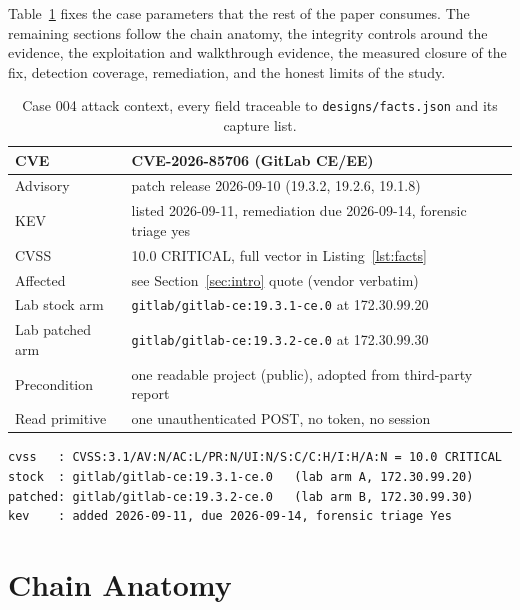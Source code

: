 \documentclass[journal]{IEEEtran}
\begin{document}
Table~\ref{tab:context} fixes the case parameters that the rest of the paper
consumes. The remaining sections follow the chain anatomy, the integrity
controls around the evidence, the exploitation and walkthrough evidence, the
measured closure of the fix, detection coverage, remediation, and the honest
limits of the study.

\begin{table}[t]
\caption{Case 004 attack context, every field traceable to
\texttt{designs/facts.json} and its capture list.}
\centering
\footnotesize
\begin{tabular}{p{1.62cm}p{5.15cm}}
\toprule
CVE & CVE-2026-85706 (GitLab CE/EE) \\
\midrule
Advisory & patch release 2026-09-10 (19.3.2, 19.2.6, 19.1.8) \\
KEV & listed 2026-09-11, remediation due 2026-09-14, forensic triage yes \\
CVSS & 10.0 CRITICAL, full vector in Listing~\ref{lst:facts} \\
Affected & see Section~\ref{sec:intro} quote (vendor verbatim) \\
Lab stock arm & \texttt{gitlab/gitlab-ce:19.3.1-ce.0} at 172.30.99.20 \\
Lab patched arm & \texttt{gitlab/gitlab-ce:19.3.2-ce.0} at 172.30.99.30 \\
Precondition & one readable project (public), adopted from third-party report \\
Read primitive & one unauthenticated POST, no token, no session \\
\bottomrule
\end{tabular}
\label{tab:context}
\end{table}

\begin{lstlisting}[style=facts, caption={Machine-readable case facts block
(the CVSS vector and build identifiers as published by their sources), captured
to \texttt{designs/facts.json}.}, label={lst:facts}]
cvss   : CVSS:3.1/AV:N/AC:L/PR:N/UI:N/S:C/C:H/I:H/A:N = 10.0 CRITICAL
stock  : gitlab/gitlab-ce:19.3.1-ce.0   (lab arm A, 172.30.99.20)
patched: gitlab/gitlab-ce:19.3.2-ce.0   (lab arm B, 172.30.99.30)
kev    : added 2026-09-11, due 2026-09-14, forensic triage Yes
\end{lstlisting}

\section{Chain Anatomy}
\end{document}
